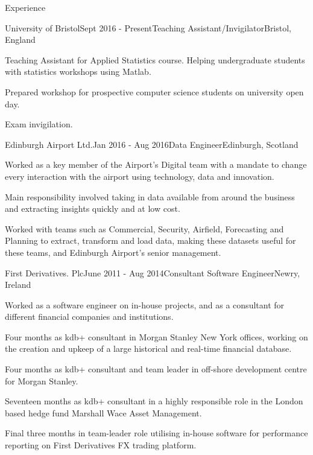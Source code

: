 \documentclass{resume} %
\begin{document}
\begin{rSection}{Experience}

\begin{rSubsection}{University of Bristol}{Sept 2016 - Present}{Teaching Assistant/Invigilator}{Bristol, England}
\item Teaching Assistant for Applied Statistics course. Helping undergraduate students with statistics workshops using Matlab.
\item Prepared workshop for prospective computer science students on university open day.
\item Exam invigilation.
\end{rSubsection}

\begin{rSubsection}{Edinburgh Airport Ltd.}{Jan 2016 - Aug 2016}{Data Engineer}{Edinburgh, Scotland}
\item Worked as a key member of the Airport's Digital team with a mandate to change every interaction with the airport using technology, data and innovation.
\item Main responsibility involved taking in data available from around the business and extracting insights quickly and at low cost.
\item Worked with teams such as Commercial, Security, Airfield, Forecasting and Planning to extract, transform and load data, making these datasets useful for these teams, and Edinburgh Airport’s senior management.
\end{rSubsection}

\begin{rSubsection}{First Derivatives. Plc}{June 2011 - Aug 2014}{Consultant Software Engineer}{Newry, Ireland}
\item Worked as a software engineer on in-house projects, and as a consultant for different financial companies and institutions.
\item Four months as kdb+ consultant in Morgan Stanley New York offices, working on the creation and upkeep of a large historical and real-time financial database.
\item Four months as kdb+ consultant and team leader in off-shore development centre for Morgan Stanley.
\item Seventeen months as kdb+ consultant in a highly responsible role in the London based hedge fund Marshall Wace Asset Management.
\item Final three months in team-leader role utilising in-house software for performance reporting on First Derivatives FX trading platform.
\end{rSubsection}


\end{rSection}
\end{document}
